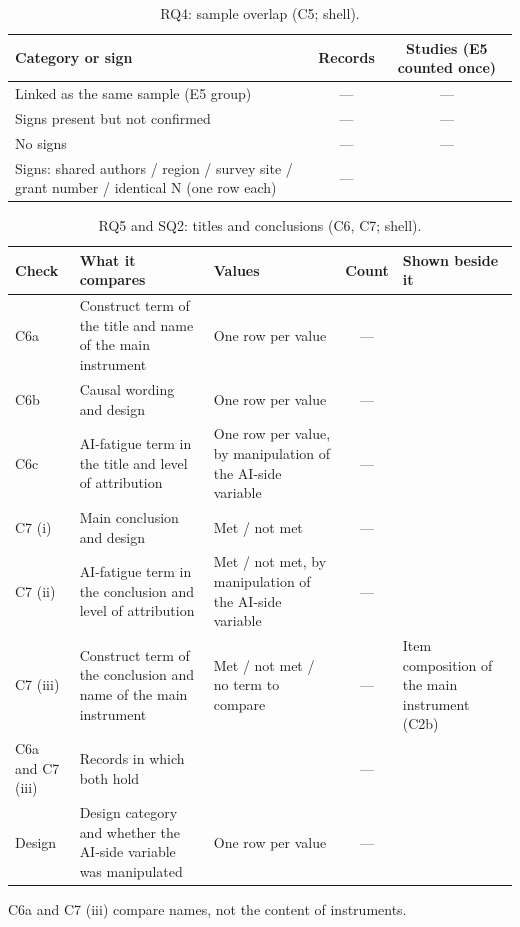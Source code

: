 \begin{table}[!htbp]
\centering
\caption{RQ4: sample overlap (C5; shell).}
\small
\begin{tabularx}{\linewidth}{Xcc}
\toprule
Category or sign & Records & Studies (E5 counted once) \\
\midrule
Linked as the same sample (E5 group) & --- & --- \\
Signs present but not confirmed & --- & --- \\
No signs & --- & --- \\
Signs: shared authors / region / survey site / grant number / identical N (one row each) & --- & \\
\bottomrule
\end{tabularx}
\end{table}

\begin{table}[!htbp]
\centering
\caption{RQ5 and SQ2: titles and conclusions (C6, C7; shell).}
\small
\begin{tabularx}{\linewidth}{lXXcX}
\toprule
Check & What it compares & Values & Count & Shown beside it \\
\midrule
C6a & Construct term of the title and name of the main instrument & One row per value & --- & \\
C6b & Causal wording and design & One row per value & --- & \\
C6c & AI-fatigue term in the title and level of attribution & One row per value, by manipulation of the AI-side variable & --- & \\
C7 (i) & Main conclusion and design & Met / not met & --- & \\
C7 (ii) & AI-fatigue term in the conclusion and level of attribution & Met / not met, by manipulation of the AI-side variable & --- & \\
C7 (iii) & Construct term of the conclusion and name of the main instrument & Met / not met / no term to compare & --- & Item composition of the main instrument (C2b) \\
C6a and C7 (iii) & Records in which both hold & & --- & \\
Design & Design category and whether the AI-side variable was manipulated & One row per value & --- & \\
\bottomrule
\end{tabularx}

\smallskip
\raggedright\footnotesize C6a and C7 (iii) compare names, not the content of instruments.
\end{table}

